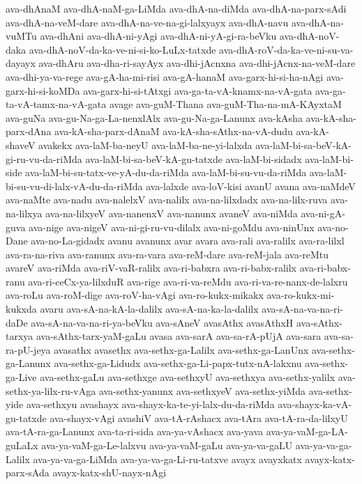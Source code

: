 {ava-dhAnaM
ava-dhA-naM-ga-LiMda
ava-dhA-na-diMda
ava-dhA-na-parx-sAdi
ava-dhA-na-veM-dare
ava-dhA-na-ve-na-gi-lalxyayx
ava-dhA-navu
ava-dhA-na-vuMTu
ava-dhAni
ava-dhA-ni-yAgi
ava-dhA-ni-yA-gi-ra-beVku
ava-dhA-noV-daka
ava-dhA-noV-da-ka-ve-ni-si-ko-LuLx-tatxde
ava-dhA-roV-da-ka-ve-ni-su-va-dayayx
ava-dhAru
ava-dha-ri-sayAyx
ava-dhi-jAcnxna
ava-dhi-jAcnx-na-veM-dare
ava-dhi-ya-va-rege
ava-gA-ha-mi-risi
ava-gA-hanaM
ava-garx-hi-si-ha-nAgi
ava-garx-hi-si-koMDa
ava-garx-hi-si-tAtxgi
ava-ga-ta-vA-knamx-na-vA-gata
ava-ga-ta-vA-tamx-na-vA-gata
avage
ava-guM-Thana
ava-guM-Tha-na-mA-KAyxtaM
ava-guNa
ava-gu-Na-ga-La-nenxlAlx
ava-gu-Na-ga-Lanunx
ava-kAsha
ava-kA-sha-parx-dAna
ava-kA-sha-parx-dAnaM
ava-kA-sha-sAthx-na-vA-dudu
ava-kA-shaveV
avakekx
ava-laM-ba-neyU
ava-laM-ba-ne-yi-lalxda
ava-laM-bi-sa-beV-kA-gi-ru-vu-da-riMda
ava-laM-bi-sa-beV-kA-gu-tatxde
ava-laM-bi-sidadx
ava-laM-bi-side
ava-laM-bi-su-tatx-ve-yA-du-da-riMda
ava-laM-bi-su-vu-da-riMda
ava-laM-bi-su-vu-di-lalx-vA-du-da-riMda
ava-lalxde
ava-loV-kisi
avanU
avana
ava-naMdeV
ava-naMte
ava-nadu
ava-nalelxV
ava-nalilx
ava-na-lilxdadx
ava-na-lilx-ruva
ava-na-lilxya
ava-na-lilxyeV
ava-nanenxV
ava-nanunx
avaneV
ava-niMda
ava-ni-gA-guva
ava-nige
ava-nigeV
ava-ni-gi-ru-vu-dilalx
ava-ni-goMdu
ava-ninUnx
ava-no-Dane
ava-no-La-gidadx
avanu
avanunx
avar
avara
ava-rali
ava-ralilx
ava-ra-lilxl
ava-ra-na-riva
ava-ranunx
ava-ra-vara
ava-reM-dare
ava-reM-jala
ava-reMtu
avareV
ava-riMda
ava-riV-vaR-ralilx
ava-ri-babxra
ava-ri-babx-ralilx
ava-ri-babx-ranu
ava-ri-ceCx-ya-lilxduR
ava-rige
ava-ri-va-reMdu
ava-ri-va-re-nanx-de-lalxru
ava-roLu
ava-roM-dige
ava-roV-ha-vAgi
ava-ro-kukx-mikakx
ava-ro-kukx-mi-kukxda
avaru
ava-sA-na-kA-la-dalilx
ava-sA-na-ka-la-dalilx
ava-sA-na-va-na-ri-daDe
ava-sA-na-va-na-ri-ya-beVku
ava-sAneV
avasAthx
avasAthxH
ava-sAthx-tarxya
ava-sAthx-tarx-yaM-gaLu
avasa
ava-sarA
ava-sa-rA-pUjA
ava-sara
ava-sa-ra-pU-jeya
avasathx
avasethx
ava-sethx-ga-Lalilx
ava-sethx-ga-LanUnx
ava-sethx-ga-Lanunx
ava-sethx-ga-Lidudx
ava-sethx-ga-Li-papx-tutx-nA-lakxnu
ava-sethx-ga-Live
ava-sethx-gaLu
ava-sethxge
ava-sethxyU
ava-sethxya
ava-sethx-yalilx
ava-sethx-ya-lilx-ru-vAga
ava-sethx-yanunx
ava-sethxyeV
ava-sethx-yiMda
ava-sethx-yide
ava-sethxyu
avashayx
ava-shayx-ka-te-yi-lalx-du-da-riMda
ava-shayx-ka-vA-gu-tatxde
ava-shayx-vAgi
avashiV
ava-tA-rAshacx
ava-tAra
ava-tA-ra-da-lilxyU
ava-tA-ra-ga-Lanunx
ava-ta-ri-sida
ava-ya-vAshacx
ava-yava
ava-ya-vaM-ga-LA-guLaLx
ava-ya-vaM-ga-Le-lalxvu
ava-ya-vaM-gaLu
ava-ya-va-gaLU
ava-ya-va-ga-Lalilx
ava-ya-va-ga-LiMda
ava-ya-va-ga-Li-ru-tatxve
avayx
avayxkatx
avayx-katx-parx-sAda
avayx-katx-shU-nayx-nAgi
}
